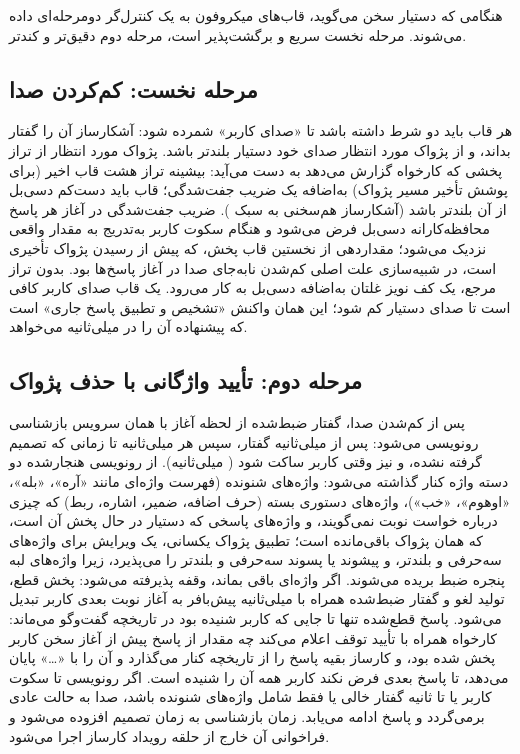 هنگامی که دستیار سخن می‌گوید، قاب‌های میکروفون به یک کنترل‌گر دومرحله‌ای
داده می‌شوند. مرحله نخست سریع و برگشت‌پذیر است، مرحله دوم دقیق‌تر و کندتر.

\subsection{مرحله نخست: کم‌کردن صدا}

هر قاب باید دو شرط داشته باشد تا «صدای کاربر» شمرده شود: آشکارساز
 آن را گفتار بداند، و از پژواک مورد انتظار صدای خود دستیار
بلندتر باشد. پژواک مورد انتظار از تراز پخشی که کارخواه گزارش می‌دهد به
دست می‌آید: بیشینه تراز هشت قاب اخیر (برای پوشش تأخیر مسیر پژواک) به‌اضافه
یک ضریب جفت‌شدگی؛ قاب باید دست‌کم  دسی‌بل از آن بلندتر باشد
(آشکارساز هم‌سخنی به سبک ). ضریب جفت‌شدگی در آغاز هر پاسخ
محافظه‌کارانه  دسی‌بل فرض می‌شود و هنگام سکوت کاربر به‌تدریج به مقدار
واقعی نزدیک می‌شود؛ مقداردهی از نخستین قاب پخش، که پیش از رسیدن پژواک تأخیری
است، در شبیه‌سازی علت اصلی کم‌شدن نابه‌جای صدا در آغاز پاسخ‌ها بود. بدون
تراز مرجع، یک کف نویز غلتان به‌اضافه  دسی‌بل به کار می‌رود. یک قاب
صدای کاربر کافی است تا صدای دستیار کم شود؛ این همان واکنش «تشخیص و تطبیق
پاسخ جاری» است که پیشنهاده آن را در  میلی‌ثانیه می‌خواهد.

\subsection{مرحله دوم: تأیید واژگانی با حذف پژواک}

پس از کم‌شدن صدا، گفتار ضبط‌شده از لحظه آغاز با همان سرویس بازشناسی
رونویسی می‌شود: پس از  میلی‌ثانیه گفتار، سپس هر 
میلی‌ثانیه تا زمانی که تصمیم گرفته نشده، و نیز وقتی کاربر ساکت شود
( میلی‌ثانیه). از رونویسی هنجارشده دو دسته واژه کنار گذاشته
می‌شود: واژه‌های شنونده (فهرست  واژه‌ای مانند «آره»، «بله»، «اوهوم»،
«خب»)، واژه‌های دستوری بسته (حرف اضافه، ضمیر، اشاره، ربط) که چیزی درباره
خواست نوبت نمی‌گویند، و واژه‌های پاسخی که دستیار در حال پخش آن است، که همان
پژواک باقی‌مانده است؛ تطبیق پژواک یکسانی، یک ویرایش برای واژه‌های سه‌حرفی و
بلندتر، و پیشوند یا پسوند سه‌حرفی و بلندتر را می‌پذیرد، زیرا واژه‌های لبه
پنجره ضبط بریده می‌شوند. اگر واژه‌ای باقی بماند، وقفه پذیرفته می‌شود: پخش قطع، تولید لغو و گفتار ضبط‌شده همراه با
 میلی‌ثانیه پیش‌بافر به آغاز نوبت بعدی کاربر تبدیل می‌شود. پاسخ قطع‌شده
تنها تا جایی که کاربر شنیده بود در تاریخچه گفت‌وگو می‌ماند: کارخواه همراه با
تأیید توقف اعلام می‌کند چه مقدار از پاسخ پیش از آغاز سخن کاربر پخش شده بود، و
کارساز بقیه پاسخ را از تاریخچه کنار می‌گذارد و آن را با «…» پایان می‌دهد، تا
پاسخ بعدی فرض نکند کاربر همه آن را شنیده است. اگر
رونویسی تا سکوت کاربر یا تا  ثانیه گفتار خالی یا فقط شامل واژه‌های
شنونده باشد، صدا به حالت عادی برمی‌گردد و پاسخ ادامه می‌یابد. زمان
بازشناسی به زمان تصمیم افزوده می‌شود و فراخوانی آن خارج از حلقه رویداد کارساز
اجرا می‌شود.

